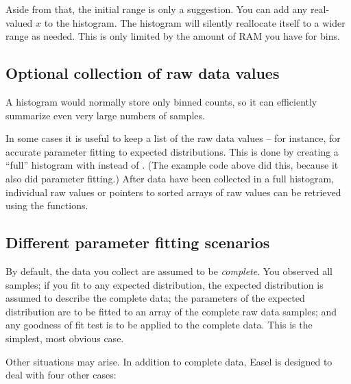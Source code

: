 Aside from that, the initial range is only a suggestion. You can add
any real-valued $x$ to the histogram. The histogram will silently
reallocate itself to a wider range as needed. This is only limited by
the amount of RAM you have for bins.


\subsection{Optional collection of raw data values}

A histogram would normally store only binned counts, so it can
efficiently summarize even very large numbers of samples.

In some cases it is useful to keep a list of the raw data values --
for instance, for accurate parameter fitting to expected
distributions. This is done by creating a ``full'' histogram with
 instead of
. (The example code above did this,
because it also did parameter fitting.) After data have been collected
in a full histogram, individual raw values or pointers to sorted
arrays of raw values can be retrieved using the
 functions.


\subsection{Different parameter fitting scenarios}

By default, the data you collect are assumed to be \emph{complete}.
You observed all samples; if you fit to any expected distribution, the
expected distribution is assumed to describe the complete data; the
parameters of the expected distribution are to be fitted to an array
of the complete raw data samples; and any goodness of fit test is to
be applied to the complete data. This is the simplest, most obvious
case.

Other situations may arise. In addition to complete data, Easel is
designed to deal with four other cases:

